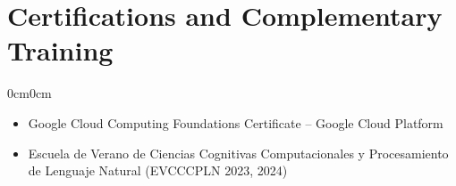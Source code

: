\documentclass[10pt, letterpaper]{article}
\newenvironment{highlights}{
	\begin{itemize}[topsep=0pt,itemsep=1pt,leftmargin=10pt]
	}{
	\end{itemize}
}
\newenvironment{onecolentry}{
	\begin{adjustwidth}{0cm}{0cm}
	}{
	\end{adjustwidth}
	\vspace{0pt}
}
\begin{document}
	\section{Certifications and Complementary Training}
	
	\begin{onecolentry}
		\begin{highlights}
			\item Google Cloud Computing Foundations Certificate – Google Cloud Platform
			\item Escuela de Verano de Ciencias Cognitivas Computacionales y Procesamiento de Lenguaje Natural (EVCCCPLN 2023, 2024)
		\end{highlights}
	\end{onecolentry}
	
\end{document}
